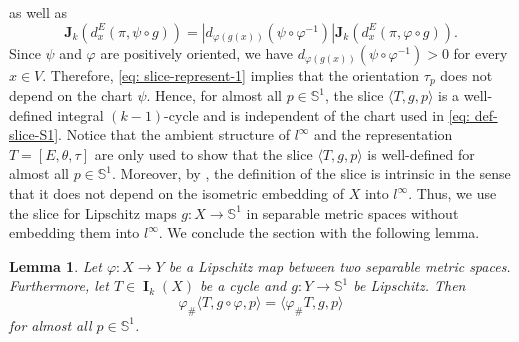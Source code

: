 \documentclass{amsart}
\newtheorem{lemma}[theorem]{Lemma}
\numberwithin{equation}{section}
\DeclareMathOperator{\bI}{\mathbf{I}}
\begin{document}
        as well as
        $$\mathbf{J}_k(d_x^E (\pi,\psi\circ g)) = |d_{\varphi(g(x))}(\psi\circ \varphi^{-1})| \mathbf{J}_k(d_x^E (\pi,\varphi\circ g)).$$
        Since $\psi$ and $\varphi$ are positively oriented, we have $d_{\varphi(g(x))}(\psi\circ \varphi^{-1})>0$ for every $x\in V$. Therefore, \eqref{eq: slice-represent-1} implies that the orientation $\tau_p$ does not depend on the chart $\psi$. Hence, for almost all $p \in \mathbb{S}^1$, the slice $\langle T,g,p\rangle$ is a well-defined integral $(k-1)$-cycle and is independent of the chart used in \eqref{eq: def-slice-S1}. Notice that the ambient structure of $l^\infty$ and the representation $T=[E,\theta,\tau]$ are only used to show that the slice $\langle T,g,p\rangle$ is well-defined for almost all $p \in \mathbb{S}^1$. Moreover, by \cite[Theorem 9.6]{ambrosio-kirchheim-2000}, the definition of the slice is intrinsic in the sense that it does not depend on the isometric embedding of $X$ into $l^\infty$. Thus, we use the slice for Lipschitz maps $g\colon X \to \mathbb{S}^1$ in separable metric spaces without embedding them into $l^\infty$. We conclude the section with the following lemma.

        
        \begin{lemma}\label{lemma: pushfw-slice-is-slice-phsfwd}
            Let $\varphi \colon X \to Y$ be a Lipschitz map between two separable metric spaces. Furthermore, let $T \in \bI_k(X)$ be a cycle and $g\colon Y\to\mathbb{S}^1$ be Lipschitz. Then 
            $$\varphi_\#\langle T, g\circ \varphi, p \rangle = \langle \varphi_\# T, g, p \rangle$$
            for almost all $p \in \mathbb{S}^1$.
        \end{lemma}
        
\end{document}
